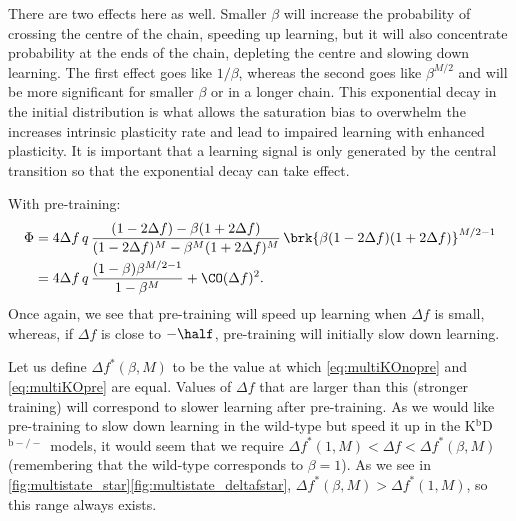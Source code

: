 \documentclass[10pt]{article}
\newcommand{\KO}{K$^\mathrm{b}$D$^{\mathrm{b}-/-}$}
\begin{document}
There are two effects here as well.
Smaller $\beta$ will increase the probability of crossing the centre of the chain, speeding up learning, but it will also concentrate probability at the ends of the chain, depleting the centre and slowing down learning.
The first effect goes like $1/\beta$, whereas the second goes like $\beta^{M/2}$ and will be more significant for smaller $\beta$ or in a longer chain.
This exponential decay in the initial distribution is what allows the saturation bias to overwhelm the increases intrinsic plasticity rate and lead to impaired learning with enhanced plasticity.
It is important that a learning signal is only generated by the central transition so that the exponential decay can take effect.

With pre-training:
%
\begin{equation}\label{eq:multiKOpre}
\begin{aligned}
  \Phi &= 4{\Delta f}\, q \, \frac{(1-2\Delta f) - \beta(1+2\Delta f)}
          {(1-2\Delta f)^M - \beta^M(1+2\Delta f)^M}   \,
          \brk{\beta (1-2\Delta f) (1+2\Delta f)}^{M/2-1} \\
       &= 4{\Delta f}\, q\,\frac{(1-\beta)\beta^{M/2-1}}{1-\beta^M} + \CO(\Delta f)^2.
\end{aligned}
\end{equation}
%
Once again, we see that pre-training will speed up learning when $\Delta f$ is small, whereas, if $\Delta f$ is close to $-\half$, pre-training will initially slow down learning.

Let us define $\Delta f^*(\beta,M)$ to be the value at which \eqref{eq:multiKOnopre} and \eqref{eq:multiKOpre} are equal.
Values of $\Delta f$ that are larger than this (stronger training) will correspond to slower learning after pre-training.
As we would like pre-training to slow down learning in the wild-type but speed it up in the \KO\ models, it would seem that we require $\Delta f^*(1,M) < \Delta f < \Delta f^*(\beta,M)$ (remembering that the wild-type corresponds to $\beta=1$).
As we see in \autoref{fig:multistate_star}\ref{fig:multistate_deltafstar}, $\Delta f^*(\beta,M) > \Delta f^*(1,M)$, so this range always exists.
\end{document}
